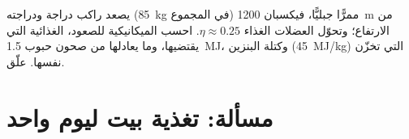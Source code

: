 \begin{exercise}[$\star\star\star$]\label{exo:g10:energy-conservation:15}
يصعد راكب دراجة ودراجته (\qty{85}{kg} في المجموع) ممرًّا جبليًّا،
فيكسبان \qty{1200}{m} من الارتفاع؛ وتحوّل العضلات الغذاء 
$\eta \approx 0.25$.
احسب  الميكانيكية للصعود،  الغذائية التي
يقتضيها، وما يعادلها من صحون حبوب \qty{1.5}{MJ}، وكتلة
البنزين (\qty{45}{MJ/kg}) التي تخزّن  نفسها. علّق.
\end{exercise}

\section{مسألة: تغذية بيت ليوم واحد}

